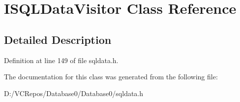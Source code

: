 \hypertarget{class_i_s_q_l_data_visitor}{}\section{I\+S\+Q\+L\+Data\+Visitor Class Reference}
\label{class_i_s_q_l_data_visitor}


\subsection{Detailed Description}


Definition at line 149 of file sqldata.\+h.



The documentation for this class was generated from the following file\+:\begin{DoxyCompactItemize}
\item 
D\+:/\+V\+C\+Repos/\+Database0/\+Database0/sqldata.\+h\end{DoxyCompactItemize}
